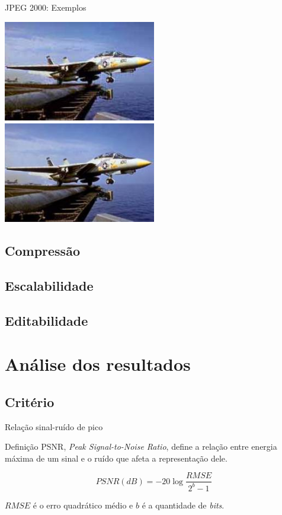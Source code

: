 \documentclass{beamer}
\begin{document}
\begin{frame}{JPEG 2000: Exemplos}
   \begin{multicols}{2}
   \includegraphics[width=0.5\textwidth]{figure/ex_jpeg_02_1.jpg}
   \includegraphics[width=0.5\textwidth]{figure/ex_jpeg2k_02_2.jpg}
   \end{multicols}
\end{frame}

\subsection{Compressão}
\subsection{Escalabilidade}
\subsection{Editabilidade}
\section{Análise dos resultados}
\subsection{Critério}
\begin{frame}{Relação sinal-ruído de pico}
   \begin{block}{Definição}
      PSNR, \emph{Peak Signal-to-Noise Ratio}, define a relação entre energia máxima de um sinal e o ruído que afeta a representação dele.

      $$ PSNR(dB) = -20 \log \frac{RMSE}{2^b -1} $$

      $RMSE$ é o erro quadrático médio e $b$ é a quantidade de \emph{bits}.
   \end{block}
\end{frame}
\end{document}
